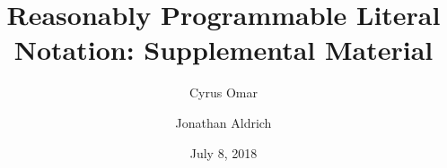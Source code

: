 \documentclass[12pt]{report}
\title{Reasonably Programmable Literal Notation: Supplemental Material}
\author{Cyrus Omar \and Jonathan Aldrich}
\date{July 8, 2018}
\newcommand{\li}[1]{\lstinline[basicstyle=\ttfamily\fontsize{10pt}{1em}\selectfont]{#1}}
\begin{document}
\renewcommand*{\thepage}{title-\arabic{page}} 
\maketitle
\renewcommand*{\thepage}{\arabic{page}} 
\appendix

\tableofcontents
\appendix






\end{document}
